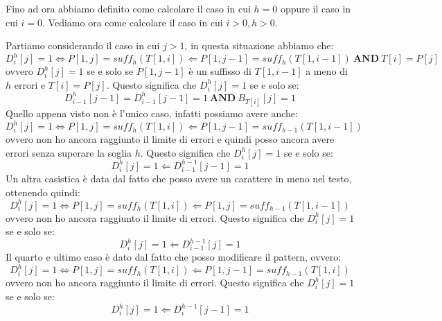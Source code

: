Fino ad ora abbiamo definito come calcolare il caso in cui $h = 0$ oppure il caso
in cui $i = 0$. Vediamo ora come calcolare il caso in cui $i > 0, h > 0$.

Partiamo considerando il caso in cui $j > 1$, in questa situazione abbiamo che:
\begin{equation}
    D_i^h[j] = 1 \iff P[1, j] =suff_h(T[1, i]) \Leftarrow P[1, j - 1] = suff_h(T[1, i - 1]) \  \textbf{AND} \ T[i] = P[j]
\end{equation}
ovvero $D_i^h[j] = 1$ se e solo se $P[1, j - 1]$ è un suffisso di $T[1, i - 1]$
a meno di $h$ errori e $T[i] = P[j]$. Questo significa che $D_i^h[j] = 1$ se e solo se:
\begin{equation}
    D_{i - 1}^h[j - 1] = D_{i - 1}^h [j - 1] = 1 \ \textbf{AND} \ B_{T[i]} [j] =  1
\end{equation}
Quello appena visto non è l'unico caso, infatti possiamo avere anche:
\begin{equation}
    D_i^h[j] = 1 \iff P[1, j] =suff_h(T[1, i]) \Leftarrow P[1, j - 1] = suff_{h - 1}(T[1, i - 1])
\end{equation}
ovvero non ho ancora raggiunto il limite di errori e quindi posso ancora avere
errori senza superare la soglia $h$. Questo significa che $D_i^h[j] = 1$ se e solo se:
\begin{equation}
    D_i^h[j] = 1 \Leftarrow D_{i - 1}^{h - 1} [j - 1] = 1
\end{equation}
Un altra casistica è data dal fatto che posso avere un carattere in meno nel testo,
ottenendo quindi:
\begin{equation}
    D_i^h[j] = 1 \iff P[1, j] =suff_h(T[1, i]) \Leftarrow P[1, j] = suff_{h - 1}(T[1, i - 1])
\end{equation}
ovvero non ho ancora raggiunto il limite di errori. Questo significa che $D_i^h[j] = 1$
se e solo se:
\begin{equation}
    D_i^h[j] = 1 \Leftarrow D_{i - 1}^{h - 1} [j] = 1
\end{equation}
Il quarto e ultimo caso è dato dal fatto che posso modificare il pattern, ovvero:
\begin{equation}
    D_i^h[j] = 1 \iff P[1, j] =suff_h(T[1, i]) \Leftarrow P[1, j - 1] = suff_{h - 1}(T[1, i])
\end{equation}
ovvero non ho ancora raggiunto il limite di errori. Questo significa che $D_i^h[j] = 1$
se e solo se:
\begin{equation}
    D_i^h[j] = 1 \Leftarrow D_{i}^{h - 1} [j - 1] = 1
\end{equation}
